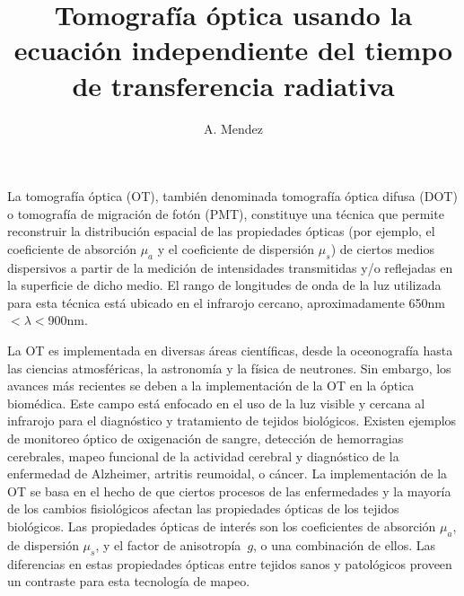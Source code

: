 \documentclass[a4paper,10pt]{article}
\title{Tomografía óptica usando la ecuación independiente del tiempo 
de transferencia radiativa}
\author{A. Mendez}
\date{}
\begin{document}
\maketitle


La tomografía óptica (OT), también denominada tomografía óptica difusa 
(DOT) o tomografía de migración de fotón (PMT), constituye una técnica
que permite reconstruir la distribución espacial de las propiedades
ópticas (por ejemplo, el coeficiente de absorción $\mu_a$ y el coeficiente 
de dispersión $\mu_s$) de ciertos medios dispersivos a partir de la 
medición de intensidades transmitidas y/o reflejadas en la superficie de
dicho medio. El rango de longitudes de onda de la luz utilizada para 
esta técnica está ubicado en el infrarojo cercano, aproximadamente
650nm$<\lambda<$900nm. 

La OT es implementada en diversas áreas científicas, desde la oceonografía 
hasta las ciencias atmosféricas, la astronomía y la física de neutrones. 
Sin embargo, los avances más recientes se deben a la implementación de la
OT en la óptica biomédica. Este campo está enfocado en el 
uso de la luz visible y cercana al infrarojo para el diagnóstico y 
tratamiento de tejidos biológicos. Existen ejemplos de monitoreo óptico 
de oxigenación de sangre, detección de hemorragias cerebrales, mapeo 
funcional de la actividad cerebral y diagnóstico de la enfermedad de 
Alzheimer, artritis reumoidal, o cáncer. La implementación de la OT se 
basa en el hecho de que ciertos procesos de las enfermedades y la mayoría 
de los cambios fisiológicos afectan las propiedades ópticas de los tejidos
biológicos. Las propiedades ópticas de interés son los coeficientes de 
absorción $\mu_a$, de dispersión $\mu_s$, y el factor de anisotropía~$g$, 
o una combinación de ellos. Las diferencias en estas propiedades ópticas 
entre tejidos sanos y patológicos proveen un contraste para esta 
tecnología de mapeo.
\end{document}
